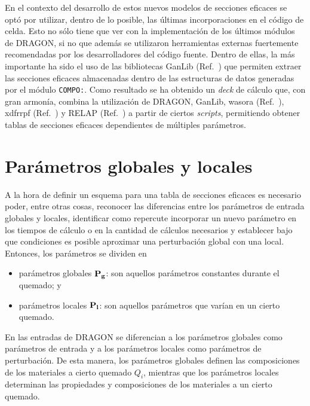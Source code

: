\documentclass[11pt]{article}
\renewcommand{\vec}[1]{\ensuremath\mathbf{#1}}
\begin{document}
En el contexto del desarrollo de estos nuevos modelos de secciones eficaces se optó por utilizar, dentro de lo posible, las últimas incorporaciones en el código de celda. Esto no sólo tiene que ver con la implementación de los últimos módulos de DRAGON, si no que además se utilizaron herramientas externas fuertemente recomendadas por los desarrolladores del código fuente. Dentro de ellas, la más importante ha sido el uso de las bibliotecas GanLib (Ref.~\cite{handbook-ganlib}) que permiten extraer las secciones eficaces almacenadas dentro de las estructuras de datos generadas por el módulo \texttt{COMPO:}. Como resultado se ha obtenido un \emph{deck} de cálculo que, con gran armonía, combina la utilización de DRAGON, GanLib, wasora (Ref.~\cite{wasora}), xdfrrpf (Ref.~\cite{xdfrrpf}) y RELAP (Ref.~\cite{relap5-mod3.3}) a partir de ciertos \emph{scripts}, permitiendo obtener tablas de secciones eficaces dependientes de múltiples parámetros.


\section{Parámetros globales y locales}
\label{sec:parametros-globales-locales}

A la hora de definir un esquema para una tabla de secciones eficaces es necesario poder, entre otras cosas, reconocer las diferencias entre los parámetros de entrada globales y locales, identificar como repercute incorporar un nuevo parámetro en los tiempos de cálculo o en la cantidad de cálculos necesarios y establecer bajo que condiciones es posible aproximar una perturbación global con una local. Entonces, los parámetros se dividen en

\begin{itemize}
\renewcommand\labelitemi{$\cdot$}
 \item parámetros globales $\vec{P_g}$: son aquellos parámetros constantes durante el quemado; y 
 \item parámetros locales $\vec{P_l}$: son aquellos parámetros que varían en un cierto quemado.
\end{itemize}
\noindent
En las entradas de DRAGON se diferencian a los parámetros globales como parámetros de entrada y a los parámetros locales como parámetros de perturbación. De esta manera, los parámetros globales definen las composiciones de los materiales a cierto quemado $Q_i$, mientras que los parámetros locales determinan las propiedades y composiciones de los materiales a un cierto quemado. 
\end{document}
